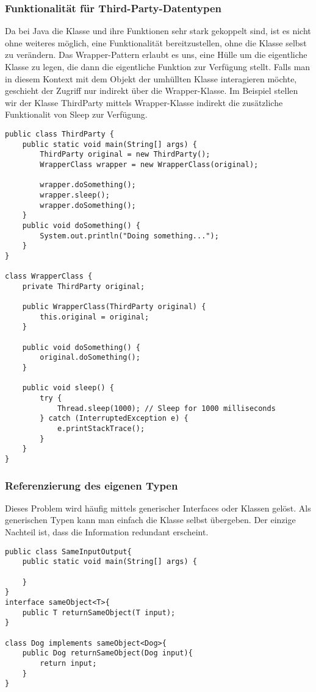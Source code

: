 \documentclass[a4paper, 1ppt]{article}
\begin{document}
\subsubsection{Funktionalität für Third-Party-Datentypen}
Da bei Java die Klasse und ihre Funktionen sehr stark gekoppelt sind, ist es nicht ohne weiteres möglich, eine Funktionalität bereitzustellen, ohne die Klasse selbst zu verändern.
Das Wrapper-Pattern\cite{websitedesignpatterns} erlaubt es uns, eine Hülle um die eigentliche Klasse zu legen, die dann die eigentliche Funktion zur Verfügung stellt.
Falls man in diesem Kontext mit dem Objekt der umhüllten Klasse interagieren möchte, geschieht der Zugriff nur indirekt über die Wrapper-Klasse.
Im Beispiel stellen wir der Klasse ThirdParty mittels Wrapper-Klasse indirekt die zusätzliche Funktionalit von Sleep zur Verfügung.
\begin{verbatim}
public class ThirdParty {
    public static void main(String[] args) {
        ThirdParty original = new ThirdParty();
        WrapperClass wrapper = new WrapperClass(original);

        wrapper.doSomething();
        wrapper.sleep();
        wrapper.doSomething();
    }
    public void doSomething() {
        System.out.println("Doing something...");
    }
}

class WrapperClass {
    private ThirdParty original;

    public WrapperClass(ThirdParty original) {
        this.original = original;
    }

    public void doSomething() {
        original.doSomething();
    }

    public void sleep() {
        try {
            Thread.sleep(1000); // Sleep for 1000 milliseconds
        } catch (InterruptedException e) {
            e.printStackTrace();
        }
    }
}
\end{verbatim}
\subsubsection{Referenzierung des eigenen Typen}
Dieses Problem wird häufig mittels generischer Interfaces oder Klassen gelöst.
Als generischen Typen kann man einfach die Klasse selbst übergeben. Der einzige Nachteil ist, dass die Information redundant erscheint.
\begin{verbatim}
public class SameInputOutput{
    public static void main(String[] args) {
        
    }
}
interface sameObject<T>{
    public T returnSameObject(T input);
}

class Dog implements sameObject<Dog>{
    public Dog returnSameObject(Dog input){
        return input;
    }
}
\end{verbatim}
\end{document}
